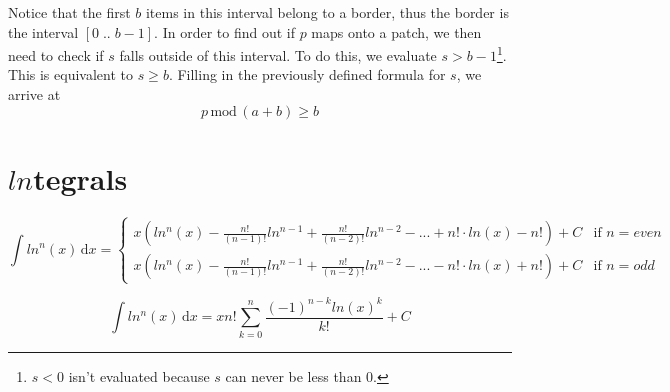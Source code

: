 \documentclass{article}
\newcommand{\dif}[1]{\,\mathrm{d}#1}
\newcommand{\natInterval}[2]{\left[#1\;..\;#2\right]}
\newcommand{\Mod}{\,\mathrm{mod}\,}
\begin{document}
Notice that the first $b$ items in this interval belong to a border, thus the border is the interval $\natInterval{0}{b-1}$. In order to find out if $p$ maps onto a patch, we then need to check if $s$ falls outside of this interval. 
To do this, we evaluate $s> b-1$\footnote[2]{$s < 0$ isn't evaluated because $s$ can never be less than 0.}.
This is equivalent to $s\geq b$.
Filling in the previously defined formula for $s$, we arrive at $$p\Mod(a + b) \geq b$$

\section{$ln$tegrals}
$$\int ln^n(x)\dif{x}=
\begin{cases}
x(ln^n(x)-\frac{n!}{(n-1)!}ln^{n-1}+\frac{n!}{(n-2)!}ln^{n-2}-...+n!\cdot ln(x)-n!)+C & \text{if } n=even \\ 
x(ln^n(x)-\frac{n!}{(n-1)!}ln^{n-1}+\frac{n!}{(n-2)!}ln^{n-2}-...-n!\cdot ln(x)+n!)+C & \text{if } n=odd
\end{cases}$$

$$\int ln^n(x)\dif{x}=xn!\sum_{k=0}^{n}\frac{(-1)^{n-k}ln(x)^k}{k!}+C$$
\end{document}

